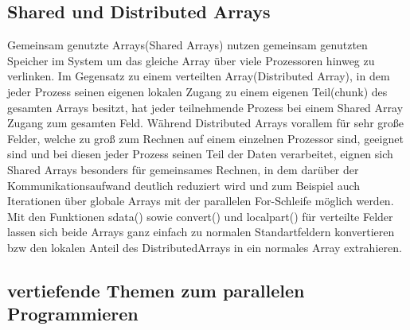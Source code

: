 \documentclass[proseminar,german,utf8]{zihpub}
\begin{document}
\subsection{Shared und Distributed Arrays}

Gemeinsam genutzte Arrays(Shared Arrays) nutzen gemeinsam genutzten Speicher im System um das gleiche Array über viele Prozessoren hinweg zu verlinken. Im Gegensatz zu einem verteilten Array(Distributed Array), in dem jeder Prozess seinen eigenen lokalen Zugang zu einem eigenen Teil(chunk) des gesamten Arrays besitzt, hat jeder teilnehmende Prozess bei einem Shared Array Zugang zum gesamten Feld. Während Distributed Arrays vorallem für sehr große Felder, welche zu groß zum Rechnen auf einem einzelnen Prozessor sind, geeignet sind und bei diesen jeder Prozess seinen Teil der Daten verarbeitet, eignen sich Shared Arrays besonders für gemeinsames Rechnen, in dem darüber der Kommunikationsaufwand deutlich reduziert wird und zum Beispiel auch Iterationen über globale Arrays mit der parallelen For-Schleife möglich werden. Mit den Funktionen sdata() sowie convert() und localpart() für verteilte Felder lassen sich beide Arrays ganz einfach zu normalen Standartfeldern konvertieren bzw den lokalen Anteil des DistributedArrays in ein normales Array extrahieren. 

\subsection{vertiefende Themen zum parallelen Programmieren}
\end{document}
